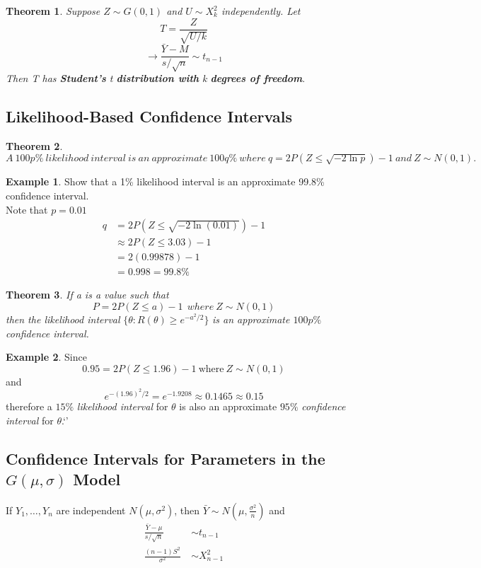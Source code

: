 \documentclass[12pt]{article}
\theoremstyle{definition}
\newtheorem*{theorem}{Theorem}
\newtheorem{ex}{Example}[section]
\begin{document}
  \begin{theorem}
    \emph{Suppose $Z \sim G(0,1)$ and $U \sim X_{k}^{2}$ independently. Let}
    $$T = \frac{Z}{\sqrt{U / k}}$$
    $$\rightarrow \frac{\bar{Y} - M}{s / \sqrt{n}} \sim t_{n-1}$$
    \emph{Then T has \textbf{Student's} t \textbf{distribution with} k \bf{degrees of freedom}}.
  \end{theorem}

  \subsection{Likelihood-Based Confidence Intervals}
  \begin{theorem}
    $A~100p\%~likelihood~interval~is~an~approximate~100q\%~where~q = 2P(Z \leq \sqrt{-2\ln p}) - 1~and~Z \sim N(0,1).$
  \end{theorem}

  \begin{ex}
    Show that a 1\% likelihood interval is an approximate 99.8\% confidence interval. \\
    Note that $p = 0.01$
    \begin{align*}
      q &= 2P(Z \leq \sqrt{-2\ln(0.01)}) - 1 \\
        &\approx 2P(Z \leq 3.03) - 1 \\
        &= 2(0.99878) - 1 \\
        &= 0.998 = 99.8\%
    \end{align*}
  \end{ex}

  \begin{theorem}
    \emph{If a is a value such that}
    $$P = 2P(Z \leq a) - 1 ~~ where ~ Z \sim N(0,1)$$
    \emph{then the likelihood interval }$\{\theta : R(\theta) \geq e^{-a^{2}/2}\}$ \emph{is an approximate $100p\%$ confidence interval.}
  \end{theorem}

  \begin{ex}
    Since
    $$0.95 = 2P(Z \leq 1.96) - 1 ~\text{where}~Z\sim N(0,1)$$
    and
    $$e^{-(1.96)^{2}/2} = e^{-1.9208} \approx 0.1465 \approx 0.15$$
    therefore a $15\%$ \emph{likelihood interval} for $\theta$ is also an approximate $95\%$ \emph{confidence interval} for $\theta$.`'
  \end{ex}

  \subsection{Confidence Intervals for Parameters in the $G(\mu, \sigma)$ Model}
  If $Y_{1}, \dots, Y_{n}$ are independent $N(\mu, \sigma^{2})$, then $\bar{Y} \sim N(\mu, \frac{\sigma^{2}}{n})$ and
  \begin{align}
     \frac{\bar{Y} - \mu}{s / \sqrt{n}}~ &\sim t_{n-1} \\
     \frac{(n-1)S^{2}}{\sigma^{2}} ~&\sim X_{n-1}^{2}
  \end{align}
\end{document}
